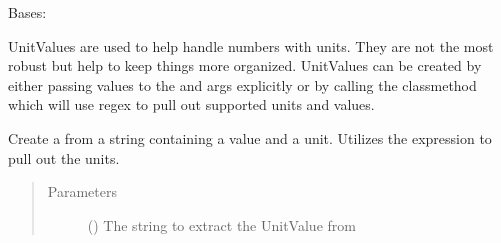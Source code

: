 \documentclass[letterpaper,10pt,english]{sphinxmanual}
\begin{document}
\begin{fulllineitems}
\label{\detokenize{polo.crystallography:polo.crystallography.cocktail.UnitValue}}
Bases: 

UnitValues are used to help handle numbers with units. They
are not the most robust but help to keep things more organized.
UnitValues can be created by either passing values to the
 and  args explicitly or by calling the classmethod
{\hyperref[\detokenize{polo.crystallography:polo.crystallography.cocktail.UnitValue.make_from_string}]{}}
which will use regex to pull out supported units and
values.

\begin{fulllineitems}
\label{\detokenize{polo.crystallography:polo.crystallography.cocktail.UnitValue.make_from_string}}
Create a  from a string containing a value and a unit.
Utilizes the  expression 
to pull out the units.

\begin{sphinxVerbatim}[commandchars=\\\{\}]
    
  
\end{sphinxVerbatim}
\begin{quote}\begin{description}
\item[{Parameters}] \leavevmode
{} () \textendash{} The string to extract the UnitValue from


\end{description}
\end{quote}
\end{fulllineitems}
\end{fulllineitems}
\end{document}
